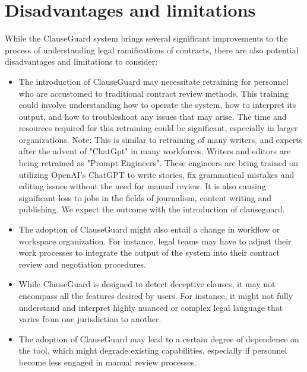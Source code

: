 \section{Disadvantages and limitations \label{Section::Disadvantages and Limitations}}
While the ClauseGuard system brings several significant improvements to the process of understanding legal ramifications of contracts, there are also potential disadvantages and limitations to consider: 
\begin{itemize}
    \item The introduction of ClauseGuard may necessitate retraining for personnel who are accustomed to traditional contract review methods. This training could involve understanding how to operate the system, how to interpret its output, and how to troubleshoot any issues that may arise. The time and resources required for this retraining could be significant, especially in larger organizations. 
    Note: This is similar to retraining of many writers, and experts after the advent of "ChatGpt" in many workforces. Writers and editors are being retrained as "Prompt Engineers". These engineers are being trained on utilizing OpenAI's ChatGPT to write stories, fix grammatical mistakes and editing issues without the need for manual review. It is also causing significant loss to jobs in the fields of journalism, content writing and publishing. We expect the outcome with the introduction of clauseguard.
    \item The adoption of ClauseGuard might also entail a change in workflow or workspace organization. For instance, legal teams may have to adjust their work processes to integrate the output of the system into their contract review and negotiation procedures.
    \item While ClauseGuard is designed to detect deceptive clauses, it may not encompass all the features desired by users. For instance, it might not fully understand and interpret highly nuanced or complex legal language that varies from one jurisdiction to another.
    \item The adoption of ClauseGuard may lead to a certain degree of dependence on the tool, which might degrade existing capabilities, especially if personnel become less engaged in manual review processes.








\end{itemize}



